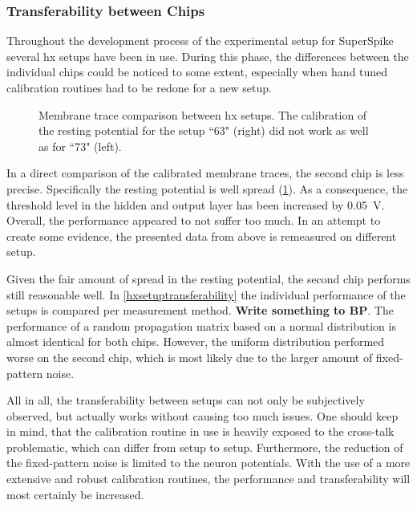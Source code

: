 \subsubsection*{Transferability between Chips}
Throughout the development process of the experimental setup for SuperSpike several \gls{hx} setups have been in use. During this phase, the differences between the individual chips could be noticed to some extent, especially when hand tuned calibration routines had to be redone for a new setup.
\begin{figure}[b!]
	\begin{subfigure}{0.5\textwidth}
		\centering
		
	\end{subfigure}
	\begin{subfigure}{0.5\textwidth}
		\centering
		
	\end{subfigure}
	\caption[Membrane trace comparison between \gls{hx} setups.]{Membrane trace comparison between \gls{hx} setups. The calibration of the resting potential for the setup ``63" (right) did not work as well as for ``73" (left).}
	\label{hxsetupmemtracescomparison}
\end{figure}
In a direct comparison of the calibrated membrane traces, the second chip is less precise. Specifically the resting potential is well spread (\cref{hxsetupmemtracescomparison}). As a consequence, the threshold level in the hidden and output layer has been increased by \SI{0.05}{V}. Overall, the performance appeared to not suffer too much. In an attempt to create some evidence, the presented data from above is remeasured on different setup.

Given the fair amount of spread in the resting potential, the second chip performs still reasonable well. In \cref{hxsetuptransferability} the individual performance of the setups is compared per measurement method. \textbf{Write something to BP}. The performance of a random propagation matrix based on a normal distribution is almost identical for both chips. However, the uniform distribution performed worse on the second chip, which is most likely due to the larger amount of fixed-pattern noise. 

All in all, the transferability between setups can not only be subjectively observed, but actually works without causing too much issues. One should keep in mind, that the calibration routine in use is heavily exposed to the cross-talk problematic, which can differ from setup to setup. Furthermore, the reduction of the fixed-pattern noise is limited to the neuron potentials. With the use of a more extensive and robust calibration routines, the performance and transferability will most certainly be increased. 

